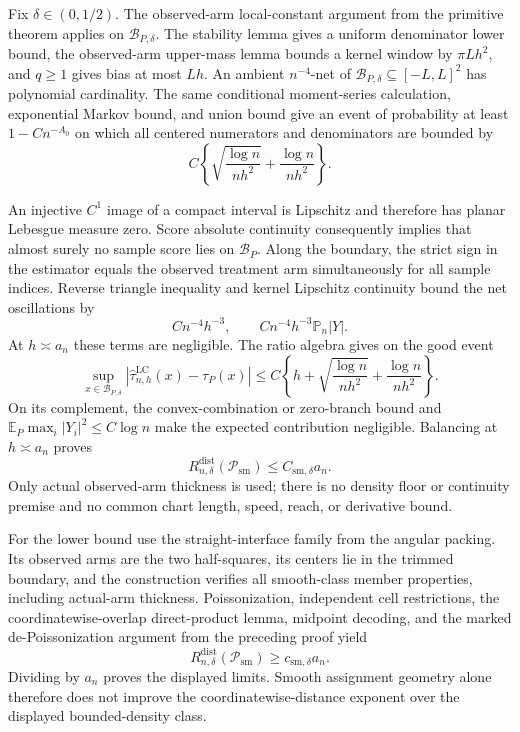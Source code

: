 Fix \(\delta\in(0,1/2)\).  The observed-arm local-constant argument from the primitive theorem applies on \(\mathcal B_{P,\delta}\).  The stability lemma gives a uniform denominator lower bound, the observed-arm upper-mass lemma bounds a kernel window by \(\pi Lh^2\), and \(q\geq1\) gives bias at most \(Lh\).  An ambient \(n^{-4}\)-net of \(\mathcal B_{P,\delta}\subseteq[-L,L]^2\) has polynomial cardinality.  The same conditional moment-series calculation, exponential Markov bound, and union bound give an event of probability at least \(1-Cn^{-A_0}\) on which all centered numerators and denominators are bounded by
\[
 C\left\{\sqrt{\frac{\log n}{nh^2}}+\frac{\log n}{nh^2}\right\}.
\]

An injective \(C^1\) image of a compact interval is Lipschitz and therefore has planar Lebesgue measure zero.  Score absolute continuity consequently implies that almost surely no sample score lies on \(\mathcal B_P\).  Along the boundary, the strict sign in the estimator equals the observed treatment arm simultaneously for all sample indices.  Reverse triangle inequality and kernel Lipschitz continuity bound the net oscillations by
\[
 Cn^{-4}h^{-3},
 \qquad Cn^{-4}h^{-3}\mathbb P_n|Y|.
\]
At \(h\asymp a_n\) these terms are negligible.  The ratio algebra gives on the good event
\[
 \sup_{x\in\mathcal B_{P,\delta}}
 |\widehat\tau^{\mathrm{LC}}_{n,h}(x)-\tau_P(x)|
 \leq C\left\{h+\sqrt{\frac{\log n}{nh^2}}+\frac{\log n}{nh^2}\right\}.
\]
On its complement, the convex-combination or zero-branch bound and \(\mathbb E_P\max_i|Y_i|^2\leq C\log n\) make the expected contribution negligible.  Balancing at \(h\asymp a_n\) proves
\[
 R_{n,\delta}^{\mathrm{dist}}(\mathcal P_{\mathrm{sm}})
 \leq C_{\mathrm{sm},\delta}a_n.
\]
Only actual observed-arm thickness is used; there is no density floor or continuity premise and no common chart length, speed, reach, or derivative bound.

For the lower bound use the straight-interface family from the angular packing.  Its observed arms are the two half-squares, its centers lie in the trimmed boundary, and the construction verifies all smooth-class member properties, including actual-arm thickness.  Poissonization, independent cell restrictions, the coordinatewise-overlap direct-product lemma, midpoint decoding, and the marked de-Poissonization argument from the preceding proof yield
\[
 R_{n,\delta}^{\mathrm{dist}}(\mathcal P_{\mathrm{sm}})
 \geq c_{\mathrm{sm},\delta}a_n.
\]
Dividing by \(a_n\) proves the displayed limits.  Smooth assignment geometry alone therefore does not improve the coordinatewise-distance exponent over the displayed bounded-density class.